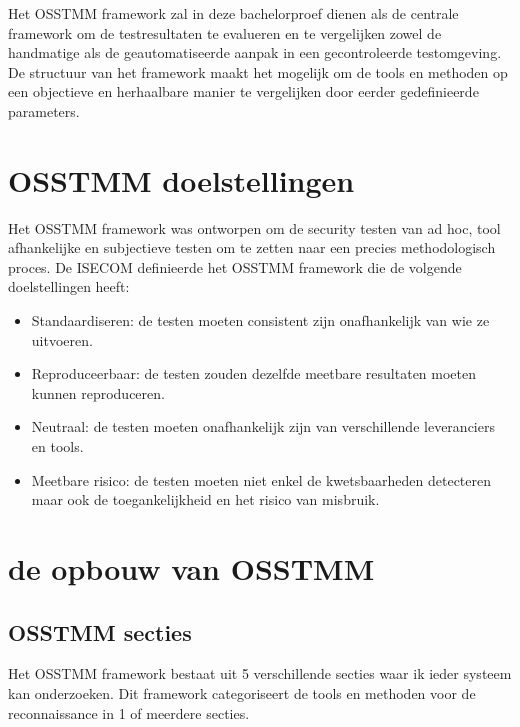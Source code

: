 Het OSSTMM framework zal in deze bachelorproef dienen als de centrale framework om de testresultaten te evalueren en te vergelijken zowel de handmatige als de geautomatiseerde aanpak in een gecontroleerde testomgeving.
De structuur van het framework maakt het mogelijk om de tools en methoden op een objectieve en herhaalbare manier te vergelijken door eerder gedefinieerde parameters.

\section{OSSTMM doelstellingen}
Het OSSTMM framework was ontworpen om de security testen van ad hoc, tool afhankelijke en subjectieve testen om te zetten naar een precies methodologisch proces.
De ISECOM definieerde het OSSTMM framework die de volgende doelstellingen heeft:

\begin{itemize}
  \item Standaardiseren: de testen moeten consistent zijn onafhankelijk van wie ze uitvoeren.
  \item Reproduceerbaar: de testen zouden dezelfde meetbare resultaten moeten kunnen reproduceren.
  \item Neutraal: de testen moeten onafhankelijk zijn van verschillende leveranciers en tools.
  \item Meetbare risico: de testen moeten niet enkel de kwetsbaarheden detecteren maar ook de toegankelijkheid en het risico van misbruik.
\end{itemize}

\section{de opbouw van OSSTMM}

\subsection{OSSTMM secties}
Het OSSTMM framework bestaat uit 5 verschillende secties waar ik ieder systeem kan onderzoeken.
Dit framework categoriseert de tools en methoden voor de reconnaissance in 1 of meerdere secties.

